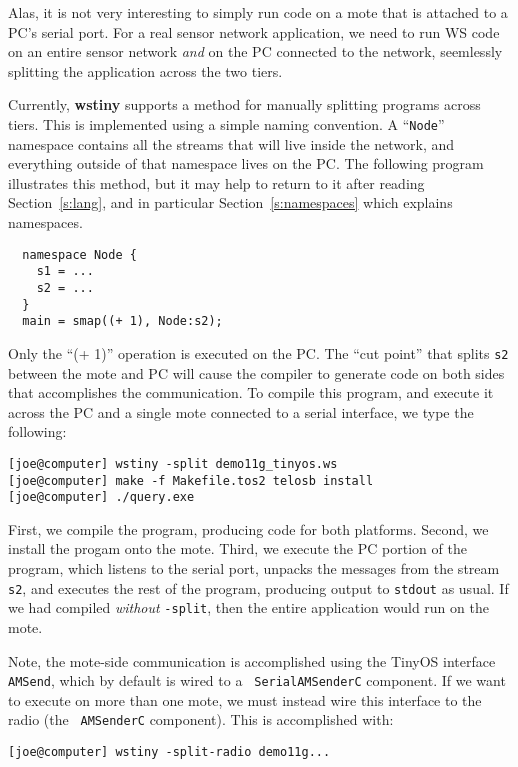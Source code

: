 \documentclass[twocolumn]{report}
\newcommand{\cde}{\tt}
\begin{document}
Alas, it is not very interesting to simply run code on a mote that is
attached to a PC's serial port.  For a real sensor network
application, we need to run WS code on an entire sensor network {\em
  and} on the PC connected to the network, seemlessly splitting the
application across the two tiers.

Currently, {\bf wstiny} supports a method for manually splitting
programs across tiers.  This is implemented using a simple naming
convention.  A ``{\cde Node}'' namespace contains all the streams that will
live inside the network, and everything outside of that namespace
lives on the PC.  The following program illustrates this method, but
it may help to return to it after reading Section~\ref{s:lang}, and in particular
Section~\ref{s:namespaces} which explains namespaces.

\begin{verbatim}
  namespace Node {
    s1 = ...
    s2 = ...
  }
  main = smap((+ 1), Node:s2);
\end{verbatim}

Only the ``(+ 1)'' operation is executed on the PC.  The ``cut point''
that splits {\cde s2} between the mote and PC will cause the compiler
to generate code on both sides that accomplishes the communication.
To compile this program, and execute it across the PC and a single
mote connected to a serial interface, we type the following:

\begin{verbatim}
[joe@computer] wstiny -split demo11g_tinyos.ws
[joe@computer] make -f Makefile.tos2 telosb install
[joe@computer] ./query.exe
\end{verbatim}

First, we compile the program, producing code for both platforms.
Second, we install the progam onto the mote.  Third, we execute the PC
portion of the program, which listens to the serial port, unpacks the
messages from the stream {\cde s2}, and executes the rest of the
program, producing output to {\tt stdout} as usual.
%
If we had compiled {\em without} {\cde -split}, then the entire
application would run on the mote.

Note, the mote-side communication is accomplished using the TinyOS
interface {\cde AMSend}, which by default is wired to a {\cde
  SerialAMSenderC} component.  If we want to execute on more than one
mote, we must instead wire this interface to the radio (the {\cde
  AMSenderC} component).  This is accomplished with:

\begin{verbatim}
[joe@computer] wstiny -split-radio demo11g...
\end{verbatim}
\end{document}
